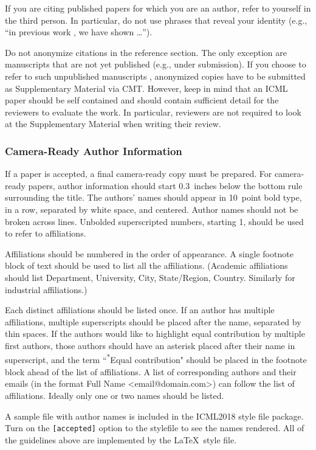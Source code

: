 \documentclass{article}
\begin{document}
If you are citing published papers for which you are an author, refer
to yourself in the third person. In particular, do not use phrases
that reveal your identity (e.g., ``in previous work \cite{langley00}, we
have shown \ldots'').

Do not anonymize citations in the reference section. The only exception are manuscripts that are
not yet published (e.g., under submission). If you choose to refer to
such unpublished manuscripts \cite{anonymous}, anonymized copies have
to be submitted
as Supplementary Material via CMT\@. However, keep in mind that an ICML
paper should be self contained and should contain sufficient detail
for the reviewers to evaluate the work. In particular, reviewers are
not required to look at the Supplementary Material when writing their
review.

\subsubsection{Camera-Ready Author Information}
\label{final author}

If a paper is accepted, a final camera-ready copy must be prepared.
%
For camera-ready papers, author information should start 0.3~inches below the
bottom rule surrounding the title. The authors' names should appear in 10~point
bold type, in a row, separated by white space, and centered. Author names should
not be broken across lines. Unbolded superscripted numbers, starting 1, should
be used to refer to affiliations.

Affiliations should be numbered in the order of appearance. A single footnote
block of text should be used to list all the affiliations. (Academic
affiliations should list Department, University, City, State/Region, Country.
Similarly for industrial affiliations.)

Each distinct affiliations should be listed once. If an author has multiple
affiliations, multiple superscripts should be placed after the name, separated
by thin spaces. If the authors would like to highlight equal contribution by
multiple first authors, those authors should have an asterisk placed after their
name in superscript, and the term ``\textsuperscript{*}Equal contribution"
should be placed in the footnote block ahead of the list of affiliations. A
list of corresponding authors and their emails (in the format Full Name
\textless{}email@domain.com\textgreater{}) can follow the list of affiliations.
Ideally only one or two names should be listed.

A sample file with author names is included in the ICML2018 style file
package. Turn on the \texttt{[accepted]} option to the stylefile to
see the names rendered. All of the guidelines above are implemented
by the \LaTeX\ style file.
\end{document}
